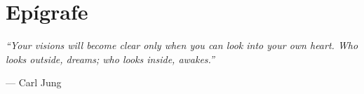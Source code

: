 \chapter*{Ep\'igrafe}
\vspace{2cm}
\begin{flushright}
    \textit{``Your visions will become clear only when you can look into
    your own heart. Who looks outside, dreams; who looks inside,
    awakes.''}

    --- Carl Jung
\end{flushright}
